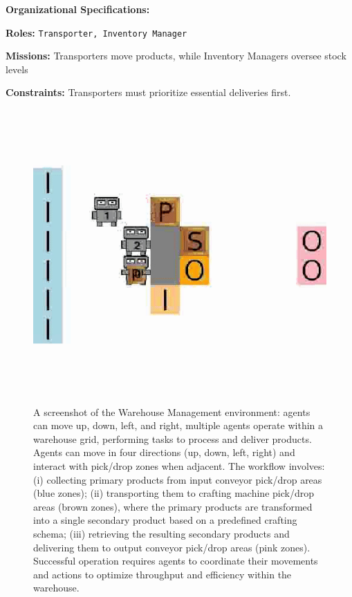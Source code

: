 \documentclass[pdflatex,sn-mathphys-num]{sn-jnl}%
\theoremstyle{thmstyleone}%
\theoremstyle{thmstyletwo}%
\theoremstyle{thmstylethree}%
\begin{document}
%
\textbf{Organizational Specifications:}
\begin{enumerate*}[label={\roman*)}, itemjoin={; \quad}]
    \item \textbf{Roles:} \texttt{Transporter, Inventory Manager}
    \item \textbf{Missions:} Transporters move products, while Inventory Managers oversee stock levels
    \item \textbf{Constraints:} Transporters must prioritize essential deliveries first.
\end{enumerate*}

\begin{figure}[h!]
    \centering
    \includegraphics[trim=0cm 3cm 0cm 3cm, clip, width=0.6\linewidth]{figures/wm.png}
    \caption{A screenshot of the Warehouse Management environment: agents can move up, down, left, and right, multiple agents operate within a warehouse grid, performing tasks to process and deliver products. Agents can move in four directions (up, down, left, right) and interact with pick/drop zones when adjacent. The workflow involves: (i) collecting primary products from input conveyor pick/drop areas (blue zones); (ii) transporting them to crafting machine pick/drop areas (brown zones), where the primary products are transformed into a single secondary product based on a predefined crafting schema; (iii) retrieving the resulting secondary products and delivering them to output conveyor pick/drop areas (pink zones). Successful operation requires agents to coordinate their movements and actions to optimize throughput and efficiency within the warehouse.}
    \label{fig:warehouse}
\end{figure}
\end{document}
